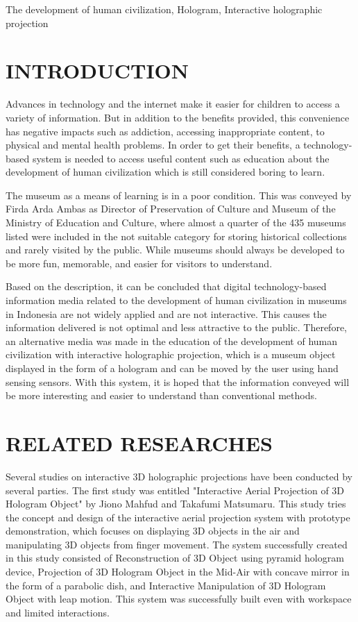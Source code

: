 \documentclass[conference]{IEEEtran}
\begin{document}
\begin{IEEEkeywords}
		 The development of human civilization, Hologram, Interactive holographic projection
\end{IEEEkeywords}
	
\section{INTRODUCTION}
	Advances in technology and the internet make it easier for children to access a variety of information. But in addition to the benefits provided, this convenience has negative impacts such as addiction, accessing inappropriate content, to physical and mental health problems\cite{sundus2018impact}. In order to get their benefits, a technology-based system is needed to access useful content such as education about the development of human civilization which is still considered boring to learn\cite{wirawan_2018}. 
	
	The museum as a means of learning is in a poor condition. This was conveyed by Firda Arda Ambas as Director of Preservation of Culture and Museum of the Ministry of Education and Culture, where almost a quarter of the 435 museums listed were included in the not suitable category for storing historical collections and rarely visited by the public\cite{kemendikbud_2019}. While museums should always be developed to be more fun, memorable, and easier for visitors to understand\cite{sheng2012study}. 
	
	Based on the description, it can be concluded that digital technology-based information media related to the development of human civilization in museums in Indonesia are not widely applied and are not interactive. This causes the information delivered is not optimal and less attractive to the public. Therefore, an alternative media was made in the education of the development of human civilization with interactive holographic projection, which is a museum object displayed in the form of a hologram and can be moved by the user using hand sensing sensors. With this system, it is hoped that the information conveyed will be more interesting and easier to understand than conventional methods.
	
\section{RELATED RESEARCHES}
	Several studies on interactive 3D holographic projections have been conducted by several parties. The first study was entitled "Interactive Aerial Projection of 3D Hologram Object" by Jiono Mahfud and Takafumi Matsumaru\cite{mahfud2016interactive}. This study tries the concept and design of the interactive aerial projection system with prototype demonstration, which focuses on displaying 3D objects in the air and manipulating 3D objects from finger movement. The system successfully created in this study consisted of Reconstruction of 3D Object using pyramid hologram device, Projection of 3D Hologram Object in the Mid-Air with concave mirror in the form of a parabolic dish, and Interactive Manipulation of 3D Hologram Object with leap motion. This system was successfully built even with workspace and limited interactions\cite{mahfud2016interactive}.
	
\end{document}
